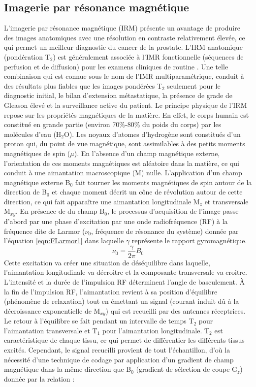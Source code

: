 \subsection*{\textbf{Imagerie par résonance magnétique}}
L’imagerie par résonance magnétique (IRM) présente un avantage de produire des images anatomiques avec une résolution en contraste relativement élevée, ce qui permet un meilleur diagnostic du cancer de la prostate. L’IRM anatomique (pondération T$_{2}$) est généralement associée à l’IMR fonctionnelle (séquences de perfusion et de diffusion) pour les examens cliniques de routine \cite{Horwitz}. Une telle combinaison qui est connue sous le nom de l’IMR multiparamétrique, conduit à des résultats plus fiables que les images pondérées T$_{2}$ seulement pour le diagnostic initial, le bilan d’extension métastatique, la présence de grade de Gleason élevé et la surveillance active du patient. Le principe physique de l’IRM repose sur les propriétés magnétiques de la matière. En effet, le corps humain est constitué en grande partie (environ 70\%-80\% du poids du corps) par les molécules d’eau (H$_{2}$O). Les noyaux d’atomes d’hydrogène sont constitués d’un proton qui, du point de vue magnétique, sont assimilables à des petits moments magnétiques de spin ($\mu$). En l’absence d’un champ magnétique externe, l’orientation de ces moments magnétiques est aléatoire dans la matière, ce qui conduit à une aimantation macroscopique (M) nulle. L’application d’un champ magnétique externe B$_{0}$ fait tourner les moments magnétiques de spin autour de la direction de B$_{0}$ et chaque moment décrit un cône de révolution autour de cette direction, ce qui fait apparaître une aimantation longitudinale M$_{z}$ et transversale M$_{xy}$. En présence de du champ B$_{0}$, le processus d’acquisition de l’image passe d’abord par une phase d’excitation par une onde radiofréquence (RF) à la fréquence dite de Larmor ($\nu_{0}$, fréquence de résonance du système) donnée par l’équation \eqref{eqn:FLarmor1} dans laquelle $\gamma$ représente le rapport gyromagnétique.
%
\begin{equation}\label{eqn:FLarmor1}
	\nu_{0}= \frac{\gamma}{2\pi}B_{0}
\end{equation}
%
Cette excitation va créer une situation de déséquilibre dans laquelle, l’aimantation longitudinale va décroitre et la composante transversale va croitre. L’intensité et la durée de l’impulsion RF déterminent l’angle de basculement. À la fin de l’impulsion RF, l’aimantation revient à sa position d’équilibre (phénomène de relaxation) tout en émettant un signal (courant induit dû à la décroissance exponentielle de M$_{xy}$) qui est recueilli par des antennes réceptrices. Le retour à l’équilibre se fait pendant un intervalle de temps T$_{2}$ pour l’aimantation transversale et T$_{1}$ pour l’aimantation longitudinale. T$_{2}$ est caractéristique de chaque tissu, ce qui permet de différentier les différents tissus excités. Cependant, le signal recueilli provient de tout l’échantillon, d’où la nécessité d’une technique de codage par application d’un gradient de champ magnétique dans la même direction que B$_{0}$ (gradient de sélection de coupe G$_{z}$) donnée par la relation :
